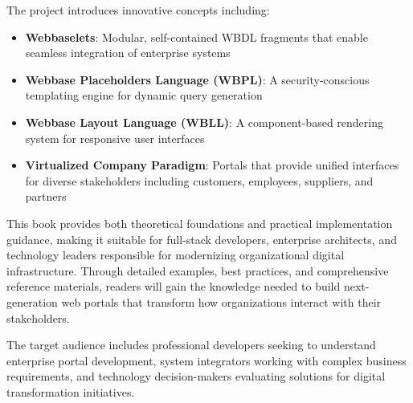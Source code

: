 The project introduces innovative concepts including:
\begin{itemize}
\item \textbf{Webbaselets}: Modular, self-contained WBDL fragments that enable seamless integration of enterprise systems
\item \textbf{Webbase Placeholders Language (WBPL)}: A security-conscious templating engine for dynamic query generation
\item \textbf{Webbase Layout Language (WBLL)}: A component-based rendering system for responsive user interfaces
\item \textbf{Virtualized Company Paradigm}: Portals that provide unified interfaces for diverse stakeholders including customers, employees, suppliers, and partners
\end{itemize}

This book provides both theoretical foundations and practical implementation guidance, making it suitable for full-stack developers, enterprise architects, and technology leaders responsible for modernizing organizational digital infrastructure. Through detailed examples, best practices, and comprehensive reference materials, readers will gain the knowledge needed to build next-generation web portals that transform how organizations interact with their stakeholders.

The target audience includes professional developers seeking to understand enterprise portal development, system integrators working with complex business requirements, and technology decision-makers evaluating solutions for digital transformation initiatives.

\clearpage
